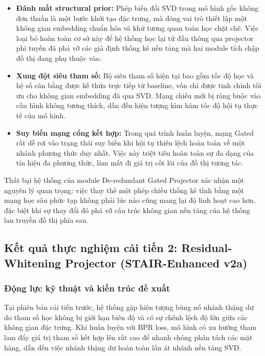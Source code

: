\begin{itemize}[leftmargin=*]
    \item \textbf{Đánh mất structural prior:} Phép biến đổi SVD trong mô hình gốc không đơn thuần là một bước khởi tạo đặc trưng, mà đóng vai trò thiết lập một không gian embedding chuẩn hóa và khử tương quan toán học chặt chẽ. Việc loại bỏ hoàn toàn cơ sở này để hệ thống học lại từ đầu thông qua projector phi tuyến đã phá vỡ các giả định thống kê nền tảng mà hai module tích chập đồ thị đang phụ thuộc vào.
    \item \textbf{Xung đột siêu tham số:} Bộ siêu tham số hiện tại bao gồm tốc độ học và hệ số cân bằng được kế thừa trực tiếp từ baseline, vốn chỉ được tinh chỉnh tối ưu cho không gian embedding đã qua SVD. Mạng chiếu mới bị ràng buộc vào cấu hình không tương thích, dẫn đến hiện tượng kìm hãm tốc độ hội tụ thực tế của mô hình.
    \item \textbf{Suy biến mạng cổng kết hợp:} Trong quá trình huấn luyện, mạng Gated rất dễ rơi vào trạng thái suy biến khi hội tụ thiên lệch hoàn toàn về một nhánh phương thức duy nhất. Việc này triệt tiêu hoàn toàn sự đa dạng của tín hiệu đa phương thức, làm mất đi giá trị cốt lõi của đồ thị tương tác.
\end{itemize}

Thất bại hệ thống của module De-redundant Gated Projector xác nhận một nguyên lý quan trọng: việc thay thế một phép chiếu thống kê tĩnh bằng một mạng học sâu phức tạp không phải lúc nào cũng mang lại độ linh hoạt cao hơn, đặc biệt khi sự thay đổi đó phá vỡ cấu trúc không gian nền tảng của hệ thống lan truyền đồ thị phía sau.

\subsection{Kết quả thực nghiệm cải tiến 2: Residual-Whitening Projector (STAIR-Enhanced v2a)}

\subsubsection{Động lực kỹ thuật và kiến trúc đề xuất}

Tại phiên bản cải tiến trước, hệ thống gặp hiện tượng bùng nổ nhánh thặng dư do tham số học không bị giới hạn biên độ và có sự chênh lệch độ lớn giữa các không gian đặc trưng. Khi huấn luyện với BPR loss, mô hình có xu hướng tham lam đẩy giá trị tham số kết hợp lên rất cao để nhanh chóng phân tách các mặt hàng, dẫn đến việc nhánh thặng dư hoàn toàn lấn át nhánh nền tảng SVD.

